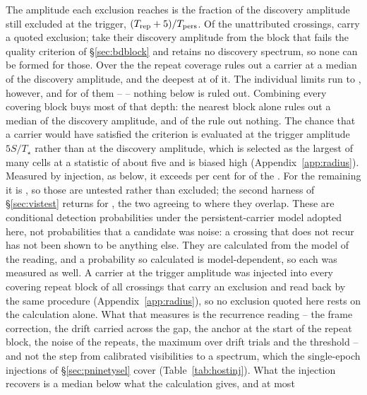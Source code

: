 The amplitude each exclusion reaches is the fraction of the discovery
amplitude still excluded at the trigger, $(T_{\rm rep}+5)/T_{\rm pers}$. Of
the \RcNTested{} unattributed crossings, \RcNExcl{} carry a quoted exclusion;
\RcNWithheld{} take their discovery amplitude from the block that fails the
quality criterion of \S\ref{sec:bdblock} and \RcNNoSpec{} retains no discovery
spectrum, so none can be formed for those. Over the \RcNExcl{} the repeat coverage rules out a carrier at a median
\RcFracMed{} of the discovery amplitude, and the deepest at \RcFracMin{} of
it. The individual limits run to \RcFracMax, however, and for \RcNFracWeak{}
of them -- \RcFracWeakList{} -- nothing below \RcFracWeakLo{} is ruled out.
Combining every covering block buys most of that depth: the nearest block
alone rules out a median \TjFracNearMed{} of the discovery amplitude, and
\TjNNearWeak{} of the \RcNExcl{} rule out nothing. The chance that a carrier would have satisfied the criterion is
evaluated at the trigger amplitude $5S/T_\star$ rather than at the
discovery amplitude, which is selected as the largest of many cells at a
statistic of about five and is biased high (Appendix~\ref{app:radius}). Measured by injection, as below, it exceeds \RcPowerLevel{} per cent for
\HjNPowerHi{} of the \RcNExcl. For the remaining \HjNPowerLo{} it is
\HjLowList, so those are untested rather than excluded; the second harness of
\S\ref{sec:vistest} returns \RjMeasCp{} for \EvBStar, the two agreeing to
\HjCrossDev{} where they overlap. These are conditional detection probabilities
under the persistent-carrier model adopted here, not probabilities that a
candidate was noise: a crossing that does not recur has not been shown to be
anything else. They are calculated from the model of the reading, and a
probability so calculated is model-dependent, so each was measured as well.
A carrier at the trigger amplitude was injected into every covering repeat
block of all \HjNMeas{} crossings that carry an exclusion and read back by
the same procedure (Appendix~\ref{app:radius}), so no exclusion quoted here
rests on the calculation alone. What that measures is the recurrence reading
-- the frame correction, the drift carried across the gap, the anchor at the
start of the repeat block, the noise of the repeats, the maximum over drift
trials and the threshold -- and not the step from calibrated visibilities to a
spectrum, which the single-epoch injections of \S\ref{sec:pninetysel} cover
(Table~\ref{tab:hostinj}). What the injection recovers is a median
\HjDevMed{} below what the calculation gives, and at most \HjDevMaxOther{}
